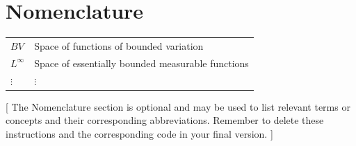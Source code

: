 \chapter[unnumbered=true]{Nomenclature}
\vspace*{-1.em}
{
  \renewcommand{\arraystretch}{1.5}
  \begin{longtable}[l]{@{}p{} p{}@{}}
    $BV$            & Space of functions of bounded variation \\
    $L^\infty$      & Space of essentially bounded measurable functions \\
    $\vdots$          & $\vdots$\\
  \end{longtable}
}

\begin{center}
  [
    The Nomenclature section is optional and may be used to list relevant terms or concepts and their corresponding abbreviations.
    Remember to delete these instructions and the corresponding code in your final version.
  ]
\end{center}
